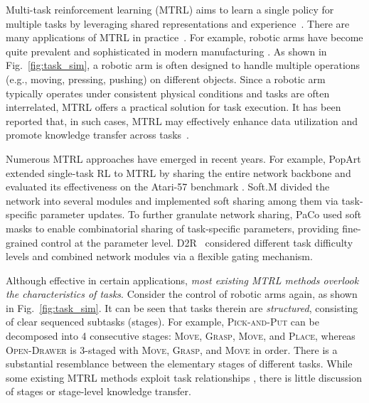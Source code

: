 \documentclass{article}
\begin{document}
Multi-task reinforcement learning (MTRL) aims to learn a single policy for multiple tasks by leveraging shared representations and experience~\cite{q2}. 
There are many applications of MTRL in practice~\cite{q60}.
For example, robotic arms have become quite prevalent and sophisticated in modern manufacturing \cite{q45}.
As shown in Fig.~\ref{fig:task_sim}, a robotic arm is often designed to handle multiple operations (e.g., moving, pressing, pushing) on different objects.
Since a robotic arm typically operates under consistent physical conditions and tasks are often interrelated, MTRL offers a practical solution for task execution.
It has been reported that, in such cases, MTRL may effectively enhance data utilization and promote knowledge transfer across tasks~\cite{q7}. 

Numerous MTRL approaches have emerged in recent years.
For example, PopArt \cite{q12} extended single-task RL to MTRL by sharing the entire network backbone and evaluated its effectiveness on the Atari-57 benchmark \cite{q81}.
Soft.M \cite{q51} divided the network into several modules and implemented soft sharing \cite{q32} among them via task-specific parameter updates.
To further granulate network sharing, PaCo \cite{q36} used soft masks to enable combinatorial sharing of task-specific parameters, providing fine-grained control at the parameter level.
D2R~\cite{q75} considered different task difficulty levels and combined network modules via a flexible gating mechanism.


Although effective in certain applications, \emph{most existing MTRL methods overlook the characteristics of tasks}.
Consider the control of robotic arms again, as shown in Fig.~\ref{fig:task_sim}.
It can be seen that tasks therein are \emph{structured}, consisting of clear sequenced subtasks (stages).
For example, \textsc{Pick-and-Put} can be decomposed into 4 consecutive stages: \textsc{Move}, \textsc{Grasp}, \textsc{Move}, and \textsc{Place}, whereas \textsc{Open-Drawer} is 3-staged with \textsc{Move}, \textsc{Grasp}, and \textsc{Move} in order.
There is a substantial resemblance between the elementary stages of different tasks.
While some existing MTRL methods exploit task relationships \cite{q39}, there is little discussion of stages or stage-level knowledge transfer.
\end{document}
